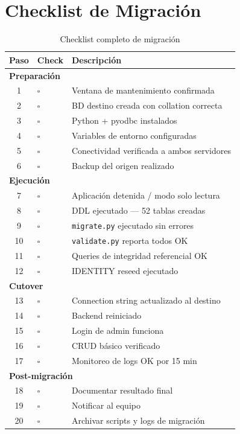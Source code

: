 \documentclass[12pt,a4paper,twoside]{report}
\begin{document}
\chapter{Checklist de Migraci\'on}

\begin{table}[H]
\centering
\caption{Checklist completo de migraci\'on}
\begin{tabularx}{\textwidth}{clX}
\toprule
\textbf{Paso} & \textbf{Check} & \textbf{Descripci\'on} \\
\midrule
\multicolumn{3}{l}{\textbf{Preparaci\'on}} \\
1  & $\square$ & Ventana de mantenimiento confirmada \\
2  & $\square$ & BD destino creada con collation correcta \\
3  & $\square$ & Python + pyodbc instalados \\
4  & $\square$ & Variables de entorno configuradas \\
5  & $\square$ & Conectividad verificada a ambos servidores \\
6  & $\square$ & Backup del origen realizado \\
\midrule
\multicolumn{3}{l}{\textbf{Ejecuci\'on}} \\
7  & $\square$ & Aplicaci\'on detenida / modo solo lectura \\
8  & $\square$ & DDL ejecutado --- 52 tablas creadas \\
9  & $\square$ & \texttt{migrate.py} ejecutado sin errores \\
10 & $\square$ & \texttt{validate.py} reporta todos OK \\
11 & $\square$ & Queries de integridad referencial OK \\
12 & $\square$ & IDENTITY reseed ejecutado \\
\midrule
\multicolumn{3}{l}{\textbf{Cutover}} \\
13 & $\square$ & Connection string actualizado al destino \\
14 & $\square$ & Backend reiniciado \\
15 & $\square$ & Login de admin funciona \\
16 & $\square$ & CRUD b\'asico verificado \\
17 & $\square$ & Monitoreo de logs OK por 15 min \\
\midrule
\multicolumn{3}{l}{\textbf{Post-migraci\'on}} \\
18 & $\square$ & Documentar resultado final \\
19 & $\square$ & Notificar al equipo \\
20 & $\square$ & Archivar scripts y logs de migraci\'on \\
\bottomrule
\end{tabularx}
\end{table}
\end{document}
